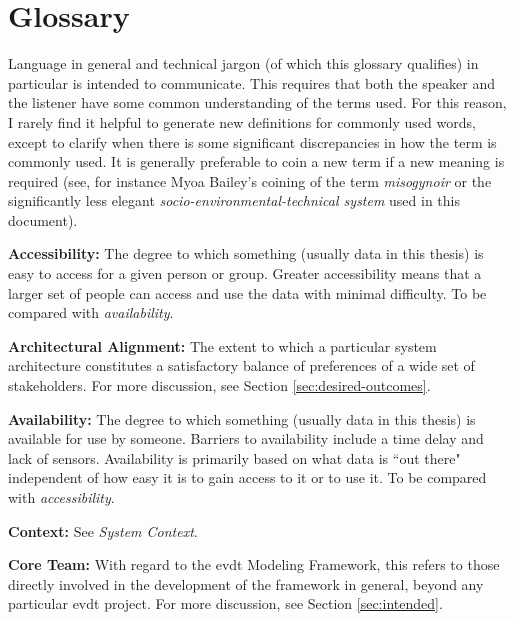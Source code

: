 \chapter{Glossary} \label{glossary}

Language in general and technical jargon (of which this glossary qualifies) in particular is intended to communicate. This requires that both the speaker and the listener have some common understanding of the terms used. For this reason, I rarely find it helpful to generate new definitions for commonly used words, except to clarify when there is some significant discrepancies in how the term is commonly used. It is generally preferable to coin a new term if a new meaning is required (see, for instance Myoa Bailey's coining of the term \textit{misogynoir} \cite{baileyMoreOriginMisogynoir} or the significantly less elegant \textit{socio-environmental-technical system} used in this document).  

\textbf{Accessibility:} The degree to which something (usually data in this thesis) is easy to access for a given person or group. Greater accessibility means that a larger set of people can access and use the data with minimal difficulty. To be compared with \textit{availability}.

\textbf{Architectural Alignment:} The extent to which a particular system architecture constitutes a satisfactory balance of preferences of a wide set of stakeholders. For more discussion, see Section \ref{sec:desired-outcomes}.

\textbf{Availability:} The degree to which something (usually data in this thesis) is available for use by someone. Barriers to availability include a time delay and lack of sensors. Availability is primarily based on what data is ``out there" independent of how easy it is to gain access to it or to use it. To be compared with \textit{accessibility}. 


\textbf{Context:} See \textit{System Context}.

\textbf{Core Team:} With regard to the \ac{evdt} Modeling Framework, this refers to those directly involved in the development of the framework in general, beyond any particular \ac{evdt} project. For more discussion, see Section \ref{sec:intended}.

